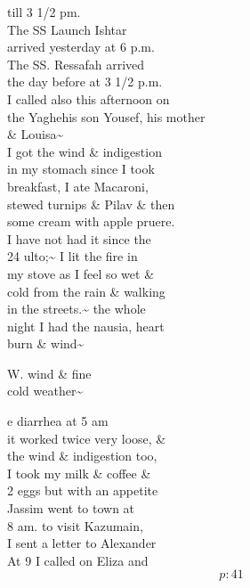 \documentclass{report}
\begin{document}
	\par{
 	till 3 1/2 pm.\ \\The SS Launch Ishtar\ \\arrived yesterday at 6 p.m.\ \\The SS. Ressafah arrived\ \\the day before at 3 1/2 p.m.\ \\I called also this afternoon on\ \\the Yaghehis son Yousef, his mother\ \\\& Louisa\~{}\ \\I got the wind \& indigestion\ \\in my stomach since I took\ \\breakfast, I ate Macaroni,\ \\stewed turnips \& Pilav \& then\ \\some cream with apple pruere.\ \\I have not had it since the\ \\24 ulto;\~{} I lit the fire in\ \\my stove as I feel so wet \&\ \\cold from the rain \& walking\ \\in the streets.\~{} the whole\ \\night I had the nausia, heart\ \\burn \& wind\~{}\ \\
	}


	\par{
 	W. wind \& fine\ \\cold weather\~{}\ \\
	}

	\par{
 	e diarrhea at 5 am\ \\it worked twice very loose, \&\ \\the wind \& indigestion too,\ \\I took my milk \& coffee \&\ \\2 eggs but with an appetite\ \\Jassim went to town at\ \\8 am. to visit Kazumain,\ \\I sent a letter to Alexander\ \\At 9 I called on Eliza and\ \\
  \[p: 41 \]

	}

\end{document}

